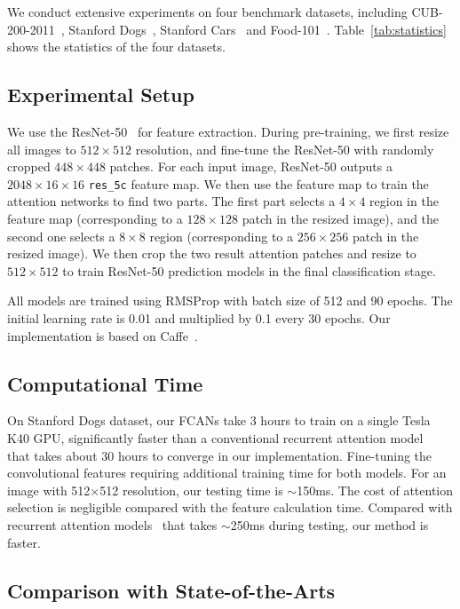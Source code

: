 \documentclass[10pt,twocolumn,letterpaper]{article}
\begin{document}
We conduct extensive experiments on four benchmark datasets, including CUB-200-2011~\cite{wah2011caltech}, Stanford Dogs~\cite{khosla2011novel}, Stanford Cars~\cite{krause20133d}  and Food-101~\cite{bossard2014food}.
Table~\ref{tab:statistics} shows the statistics of the four datasets.

\subsection{Experimental Setup}
We use the ResNet-50~\cite{he2016deep} for feature extraction. During pre-training, we first resize all images to $512 \times512 $ resolution, and fine-tune the ResNet-50 with randomly cropped $448\times448$ patches.
For each input image, ResNet-50 outputs a $2048\times16\times16$ \texttt{res\_5c} feature map.
We then use the feature map to train the attention networks to find two parts.
The first part selects a $4\times4$ region in the feature map (corresponding to a $128\times128$ patch in the resized image), and the second one selects a $8\times8$ region (corresponding to a $256\times256$ patch in the resized image).
We then crop the two result attention patches and resize to $512\times512$ to train ResNet-50 prediction models in the final classification stage.

All models are trained using RMSProp with batch size of 512 and 90 epochs.
The initial learning rate is 0.01 and multiplied by 0.1 every 30 epochs.
Our implementation is based on Caffe~\cite{jia2014caffe}.

\subsection{Computational Time}

On Stanford Dogs dataset, our FCANs take 3 hours to train on a single Tesla K40 GPU, significantly faster than a conventional recurrent attention model~\cite{sermanet2014attention} that takes about 30 hours to converge in our implementation.
Fine-tuning the convolutional features requiring additional training time for both models.
For an image with 512$\times$512 resolution, our testing time is $\sim$150ms.
The cost of attention selection is negligible compared with the feature calculation time.
Compared with recurrent attention models~\cite{sermanet2014attention} that takes $\sim$250ms during testing, our method is faster.

\subsection{Comparison with State-of-the-Arts}
\end{document}
